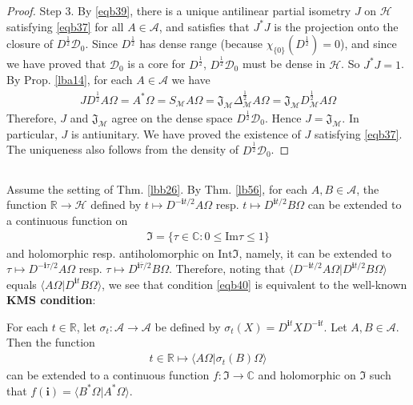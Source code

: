 \documentclass[12pt,b5paper,notitlepage]{article}
\theoremstyle{definition}
\theoremstyle{plain}
\newcommand{\fk}{\mathfrak}
\newcommand{\mc}{\mathcal}
\newcommand{\ovl}{\overline}
\newcommand{\Dom}{\scr{D}}
\newcommand{\bk}[1]{\langle {#1}\rangle}
\newcommand{\scr}{\mathscr}
\newcommand{\im}{\mathbf{i}}
\newcommand{\Cbb}{\mathbb C}
\newcommand{\Rbb}{\mathbb R}
\newcommand{\Imag}{\mathrm{Im}}
\newcommand{\Int}{\mathrm{Int}}
\numberwithin{equation}{section}
\begin{document}
\begin{proof}
Step 3. By \eqref{eqb39}, there is a unique antilinear partial isometry $J$ on $\mc H$ satisfying \eqref{eqb37} for all $A\in\scr A$, and satisfies that $J^*J$ is the projection onto the closure of $D^{\frac 12}\Dom_0$. Since $D^{\frac 12}$ has dense range (because $\chi_{\{0\}}(D^{\frac 12})=0$), and since we have proved that $\Dom_0$ is a core for $D^{\frac 12}$,  $D^{\frac 12}\Dom_0$ must be dense in $\mc H$. So $J^*J=1$. By Prop. \ref{lba14}, for each $A\in\scr A$ we have
\begin{align*}
JD^{\frac 12}A\Omega=A^*\Omega= S_{\mc M}A\Omega=\fk J_{\mc M}\Delta_{\mc M}^{\frac 12}A\Omega=\fk J_{\mc M}D_{\mc M}^{\frac 12}A\Omega
\end{align*}
Therefore, $J$ and $\fk J_{\mc M}$ agree on the dense space $D^{\frac 12}\Dom_0$. Hence $J=\fk J_{\mc M}$. In particular, $J$ is antiunitary. We have proved the existence of $J$ satisfying \eqref{eqb37}. The uniqueness also follows from the density of $D^{\frac 12}\Dom_0$.
\end{proof}





\subsection{}

Assume the setting of Thm. \ref{lbb26}. By Thm. \ref{lb56}, for each $A,B\in\scr A$, the function $\Rbb\rightarrow\mc H$ defined by $t\mapsto D^{-\im t/2}A\Omega$ resp. $t\mapsto D^{\im t/2}B\Omega$ can be extended to a continuous function on
\begin{align*}
\fk I=\{\tau\in\Cbb:0\leq\Imag \tau\leq 1\}
\end{align*}
and holomorphic resp. antiholomorphic on $\Int\fk I$, namely, it can be extended to $\tau\mapsto D^{-\im\tau/2}A\Omega$ resp. $\tau\mapsto D^{\im\ovl\tau/2}B\Omega$. Therefore, noting that $\bk{D^{-\im t/2}A\Omega|D^{\im t/2}B\Omega}$ equals $\bk{A\Omega|D^{\im t}B\Omega}$, we see that  condition \eqref{eqb40} is equivalent to the well-known \textbf{KMS condition}: 

For each $t\in\Rbb$, let $\sigma_t:\scr A\rightarrow\scr A$ be defined by $\sigma_t(X)=D^{\im t}XD^{-\im t}$. Let $A,B\in\scr A$. Then the function
\begin{align*}
t\in\Rbb\mapsto \bk{A\Omega|\sigma_t(B)\Omega}
\end{align*}
can be extended to a continuous function $f:\fk I\rightarrow\Cbb$ and holomorphic on $\fk I$ such that  $f(\im)=\bk{B^*\Omega|A^*\Omega}$.  
\end{document}
